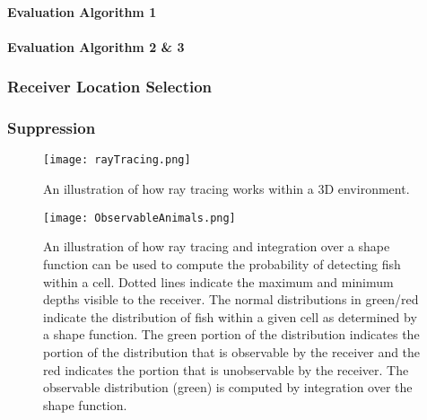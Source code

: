 \paragraph{Evaluation Algorithm 1}

\paragraph{Evaluation Algorithm 2 \& 3}

\subsubsection{Receiver Location Selection}

\subsubsection{Suppression}


\begin{figure}[t]
	\label{rayTracing}
	\centering
	\texttt{[image: rayTracing.png]}
	\caption{An illustration of how ray tracing works within a 3D environment. \cite{Akbarzadeh2013}}
\end{figure}

\begin{figure}[t]
	\label{observableAnimals}
	\centering
	\texttt{[image: ObservableAnimals.png]}
	\caption{An illustration of how ray tracing and integration over a shape function can be used to compute the probability of detecting fish within a cell.  Dotted lines indicate the maximum and minimum depths visible to the receiver.  The normal distributions in green/red indicate the distribution of fish within a given cell as determined by a shape function.  The green portion of the distribution indicates the portion of the distribution that is observable by the receiver and the red indicates the portion that is unobservable by the receiver.  The observable distribution (green) is computed by integration over the shape function.}
\end{figure}